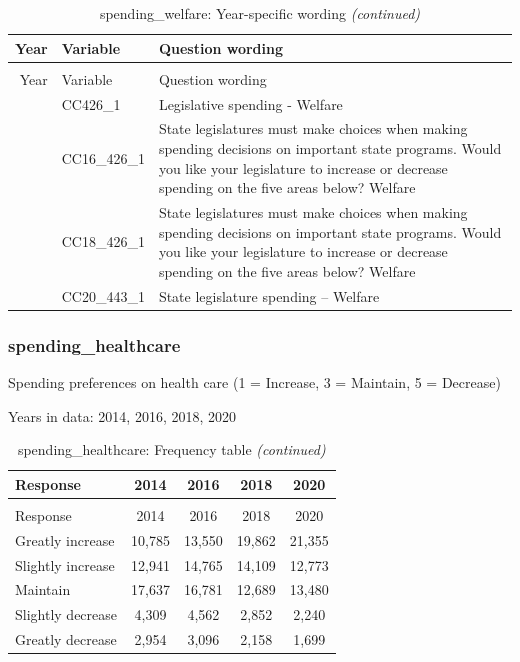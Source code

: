 \documentclass[
  12pt]{article}
\begin{document}
\begin{longtable}[t]{rl>{\raggedright\arraybackslash}p{10cm}}
\caption{\label{tab:unnamed-chunk-5}spending\_welfare: Year-specific wording}\\
\toprule
Year & Variable & Question wording\\
\midrule
\endfirsthead
\caption[]{spending\_welfare: Year-specific wording \textit{(continued)}}\\
\toprule
Year & Variable & Question wording\\
\midrule
\endhead

\endfoot
\bottomrule
\endlastfoot
2014 & CC426\_1 & Legislative spending - Welfare\\
\addlinespace
2016 & CC16\_426\_1 & State legislatures must make choices when making spending decisions on important state programs. Would you like your legislature to increase or decrease spending on the five areas below? Welfare\\
\addlinespace
2018 & CC18\_426\_1 & State legislatures must make choices when making spending decisions on important state programs. Would you like your legislature to increase or decrease spending on the five areas below? Welfare\\
\addlinespace
2020 & CC20\_443\_1 & State legislature spending -- Welfare\\*
\end{longtable}
\endgroup{}

\hypertarget{spending_healthcare}{%
\subsubsection{spending\_healthcare}\label{spending_healthcare}}

Spending preferences on health care (1 = Increase, 3 = Maintain, 5 =
Decrease)

Years in data: 2014, 2016, 2018,
2020\begingroup\fontsize{10}{12}\selectfont

\begin{longtable}[t]{lcccc}
\caption{\label{tab:unnamed-chunk-5}spending\_healthcare: Frequency table}\\
\toprule
Response & 2014 & 2016 & 2018 & 2020\\
\midrule
\endfirsthead
\caption[]{spending\_healthcare: Frequency table \textit{(continued)}}\\
\toprule
Response & 2014 & 2016 & 2018 & 2020\\
\midrule
\endhead

\endfoot
\bottomrule
\endlastfoot
Greatly increase & 10,785 & 13,550 & 19,862 & 21,355\\
Slightly increase & 12,941 & 14,765 & 14,109 & 12,773\\
Maintain & 17,637 & 16,781 & 12,689 & 13,480\\
Slightly decrease & 4,309 & 4,562 & 2,852 & 2,240\\
Greatly decrease & 2,954 & 3,096 & 2,158 & 1,699\\*
\end{longtable}
\endgroup{}
\end{document}
